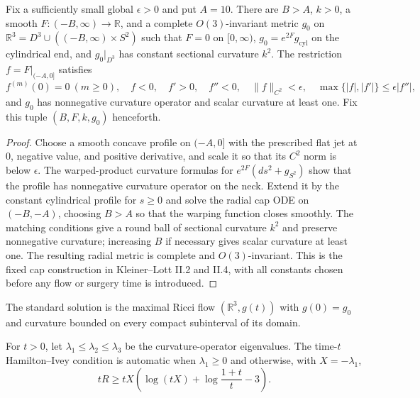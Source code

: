 \begin{lemma}
\label{lem:standard-surgery-cap-model}
\notready
Fix a sufficiently small global $\epsilon>0$ and put $A=10$.  There are
$B>A$, $k>0$, a smooth $F:(-B,\infty)\to\mathbb R$, and a complete
$O(3)$-invariant metric $g_0$ on
$\mathbb R^3=D^3\cup((-B,\infty)\times S^2)$ such that $F=0$ on
$[0,\infty)$, $g_0=e^{2F}g_{\mathrm{cyl}}$ on the cylindrical end, and
$g_0|_{D^3}$ has constant sectional curvature $k^2$.  The restriction
$f=F|_{(-A,0]}$ satisfies
\[
 f^{(m)}(0)=0\ (m\ge0),\quad f<0,\quad f'>0,\quad f''<0,\quad
 \|f\|_{C^2}<\epsilon,\quad
 \max\{|f|,|f'|\}\le\epsilon|f''|,
\]
and $g_0$ has nonnegative curvature operator and scalar curvature at least
one.  Fix this tuple $(B,F,k,g_0)$ henceforth.
\end{lemma}

\begin{proof}
Choose a smooth concave profile on $(-A,0]$ with the prescribed flat jet at
$0$, negative value, and positive derivative, and scale it so that its $C^2$
norm is below $\epsilon$.  The warped-product curvature formulas for
$e^{2F}(ds^2+g_{S^2})$ show that the profile has nonnegative curvature
operator on the neck.  Extend it by the constant cylindrical profile for
$s\ge0$ and solve the radial cap ODE on $(-B,-A)$, choosing $B>A$ so that the
warping function closes smoothly.  The matching conditions give a round ball
of sectional curvature $k^2$ and preserve nonnegative curvature; increasing
$B$ if necessary gives scalar curvature at least one.  The resulting radial
metric is complete and $O(3)$-invariant.  This is the fixed cap construction
in Kleiner--Lott II.2 and II.4, with all constants chosen before any flow or
surgery time is introduced.
\end{proof}

\begin{definition}
\label{def:standard-solution}
\notready
The standard solution is the maximal Ricci flow $(\mathbb R^3,g(t))$ with
$g(0)=g_0$ and curvature bounded on every compact subinterval of its domain.
\end{definition}

\begin{definition}
\label{def:hamilton-ivey-pinching-condition}
\notready
For $t>0$, let $\lambda_1\le\lambda_2\le\lambda_3$ be the curvature-operator
eigenvalues.  The time-$t$ Hamilton--Ivey condition is automatic when
$\lambda_1\ge0$ and otherwise, with $X=-\lambda_1$,
\[
 tR\ge tX\left(\log(tX)+\log\frac{1+t}{t}-3\right).
\]
\end{definition}

